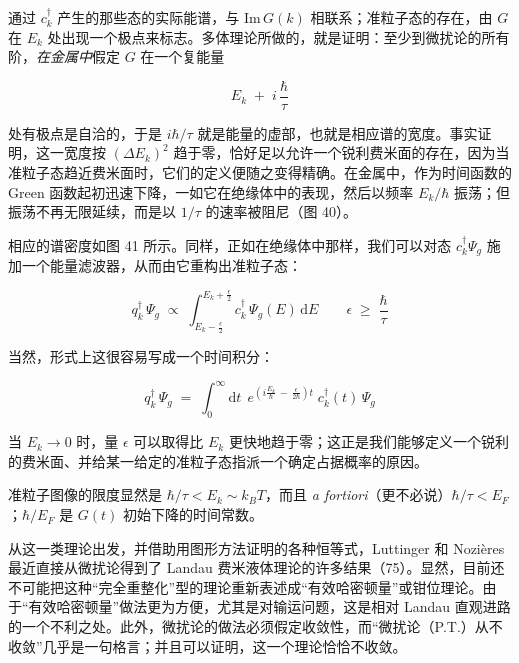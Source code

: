 通过 $c_k^{\dagger}$ 产生的那些态的实际能谱，与 $\mathrm{Im}\, G(k)$ 相联系；准粒子态的存在，由 $G$ 在 $E_k$ 处出现一个极点来标志。多体理论所做的，就是证明：至少到微扰论的所有阶，\emph{在金属中}假定 $G$ 在一个复能量

\begin{equation*}
E_k \;+\; i\,\frac{\hbar}{\tau}
\end{equation*}

处有极点是自洽的，于是 $i\hbar/\tau$ 就是能量的虚部，也就是相应谱的宽度。事实证明，这一宽度按 $(\Delta E_k)^{2}$ 趋于零，恰好足以允许一个锐利费米面的存在，因为当准粒子态趋近费米面时，它们的定义便随之变得精确。在金属中，作为时间函数的 Green 函数起初迅速下降，一如它在绝缘体中的表现，然后以频率 $E_k/\hbar$ 振荡；但振荡不再无限延续，而是以 $1/\tau$ 的速率被阻尼（图 40）。



相应的谱密度如图 41 所示。同样，正如在绝缘体中那样，我们可以对态 $c_k^{\dagger}\Psi_{g}$ 施加一个能量滤波器，从而由它重构出准粒子态：

\begin{equation*}
q_k^{\dagger}\,\Psi_{g} \;\propto\; \int_{E_k-\frac{\epsilon}{2}}^{E_k+\frac{\epsilon}{2}} c_k^{\dagger}\,\Psi_{g}(E)\,\mathrm{d}E
\qquad \epsilon \;\geq\; \frac{\hbar}{\tau}
\end{equation*}

当然，形式上这很容易写成一个时间积分：

\begin{equation*}
q_k^{\dagger}\,\Psi_{g} \;=\; \int_{0}^{\infty} \mathrm{d}t\;\, e^{\left(i\frac{E_k}{\hbar} \,-\, \frac{\epsilon}{2\hbar}\right)t}\; c_k^{\dagger}(t)\,\Psi_{g}
\end{equation*}

当 $E_k \to 0$ 时，量 $\epsilon$ 可以取得比 $E_k$ 更快地趋于零；这正是我们能够定义一个锐利的费米面、并给某一给定的准粒子态指派一个确定占据概率的原因。

准粒子图像的限度显然是 $\hbar/\tau < E_k \sim k_B T$，而且 \emph{a fortiori}（更不必说）$\hbar/\tau < E_F$；$\hbar/E_F$ 是 $G(t)$ 初始下降的时间常数。

从这一类理论出发，并借助用图形方法证明的各种恒等式，Luttinger 和 Nozières 最近直接从微扰论得到了 Landau 费米液体理论的许多结果（75）。显然，目前还不可能把这种“完全重整化”型的理论重新表述成“有效哈密顿量”或钳位理论。由于“有效哈密顿量”做法更为方便，尤其是对输运问题，这是相对 Landau 直观进路的一个不利之处。此外，微扰论的做法必须假定收敛性，而“微扰论（P.T.）从不收敛”几乎是一句格言；并且可以证明，这一个理论恰恰不收敛。

